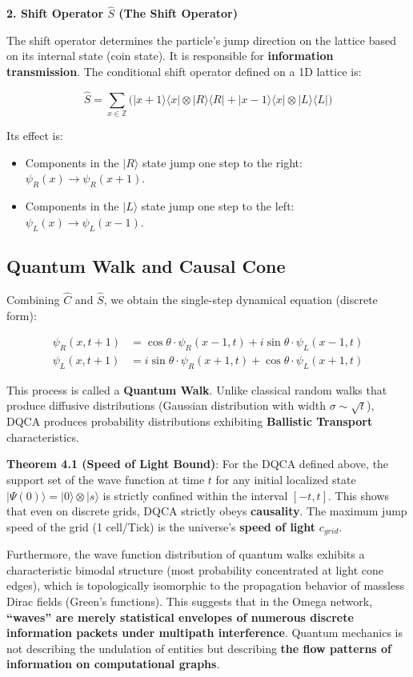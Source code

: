 \textbf{2. Shift Operator $\hat{S}$ (The Shift Operator)}

The shift operator determines the particle's jump direction on the lattice based on its internal state (coin state). It is responsible for \textbf{information transmission}.
The conditional shift operator defined on a 1D lattice is:

\[\hat{S} = \sum_{x \in \mathbb{Z}} \Big( |x+1\rangle\langle x| \otimes |R\rangle\langle R| + |x-1\rangle\langle x| \otimes |L\rangle\langle L| \Big)\]

Its effect is:

\begin{itemize}
\item Components in the $|R\rangle$ state jump one step to the right: $\psi_R(x) \to \psi_R(x+1)$.
\item Components in the $|L\rangle$ state jump one step to the left: $\psi_L(x) \to \psi_L(x-1)$.
\end{itemize}

\subsection{Quantum Walk and Causal Cone}

Combining $\hat{C}$ and $\hat{S}$, we obtain the single-step dynamical equation (discrete form):

\begin{align*}
\psi_R(x, t+1) &= \cos\theta \cdot \psi_R(x-1, t) + i \sin\theta \cdot \psi_L(x-1, t) \\
\psi_L(x, t+1) &= i \sin\theta \cdot \psi_R(x+1, t) + \cos\theta \cdot \psi_L(x+1, t)
\end{align*}

This process is called a \textbf{Quantum Walk}. Unlike classical random walks that produce diffusive distributions (Gaussian distribution with width $\sigma \sim \sqrt{t}$), DQCA produces probability distributions exhibiting \textbf{Ballistic Transport} characteristics.

\textbf{Theorem 4.1 (Speed of Light Bound)}:
For the DQCA defined above, the support set of the wave function at time $t$ for any initial localized state $|\Psi(0)\rangle = |0\rangle \otimes |s\rangle$ is strictly confined within the interval $[-t, t]$.
This shows that even on discrete grids, DQCA strictly obeys \textbf{causality}. The maximum jump speed of the grid (1 cell/Tick) is the universe's \textbf{speed of light} $c_{grid}$.

Furthermore, the wave function distribution of quantum walks exhibits a characteristic bimodal structure (most probability concentrated at light cone edges), which is topologically isomorphic to the propagation behavior of massless Dirac fields (Green's functions). This suggests that in the Omega network, \textbf{``waves'' are merely statistical envelopes of numerous discrete information packets under multipath interference}. Quantum mechanics is not describing the undulation of entities but describing \textbf{the flow patterns of information on computational graphs}.
